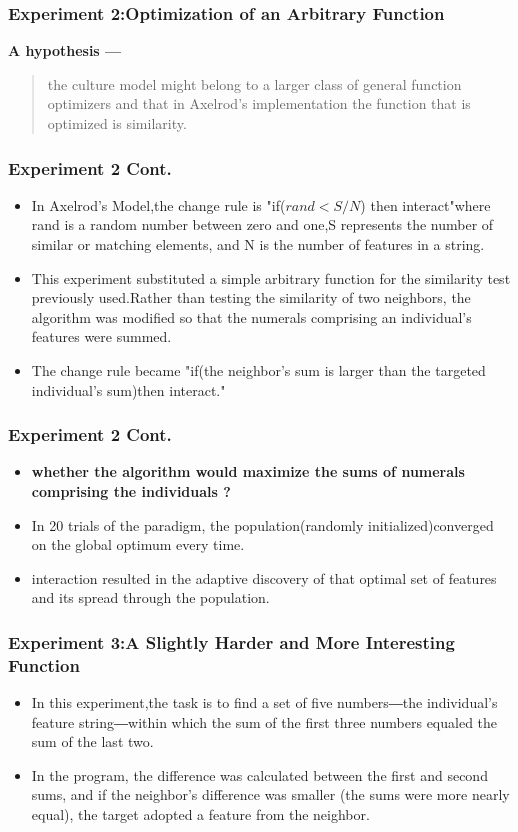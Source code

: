 \documentclass[CJK]{beamer}
\begin{document}
\begin{CJK*}{GBK}{song}
\begin{frame}
\frametitle{Experiment 2:Optimization of an Arbitrary Function}
\textbf{A hypothesis ---}
\begin{quote}
     the culture model might belong to a larger class of general function optimizers and that in Axelrod's implementation the function that is optimized is similarity.
\end{quote}
\end{frame}

\begin{frame}
\frametitle{Experiment 2 Cont.}
\begin{itemize}
\item{In Axelrod's Model,the change rule is "if($rand < S/N$) then interact"where rand is a random number between zero and one,S represents the number of similar or matching elements, and N is the number of features in a string.}
\item{This experiment substituted a simple arbitrary function for the similarity test previously used.Rather than testing the similarity of two neighbors, the algorithm was modified so that the numerals comprising an individual's features were summed.}
\item{The change rule became "\textcolor[rgb]{0.98,0.00,0.00}{if(the neighbor's sum is larger than the targeted individual's sum)then interact.}"}
\end{itemize}
\end{frame}

\begin{frame}
\frametitle{Experiment 2 Cont.}
\begin{itemize}
\item{\textbf{whether the algorithm would maximize the sums of numerals comprising the individuals ?}}
\item{In 20 trials of the paradigm, the population(randomly initialized)converged on the global optimum every time.}
\item{interaction resulted in the adaptive discovery of that optimal set of features and its spread through the population.}
\end{itemize}
\end{frame}
\begin{frame}
\frametitle{Experiment 3:A Slightly Harder and More Interesting Function}
\begin{itemize}
\item{In this experiment,the task is  to find a set of five numbers―the individual’s feature string―within which the sum of the first three numbers equaled the sum of the last two.}
\item{In the program, the difference was calculated between the first and second sums, and if the neighbor's difference was smaller (the sums were more nearly equal), the target adopted a feature from the neighbor.}
\end{itemize}
\end{frame}


\end{CJK*}
\end{document}
